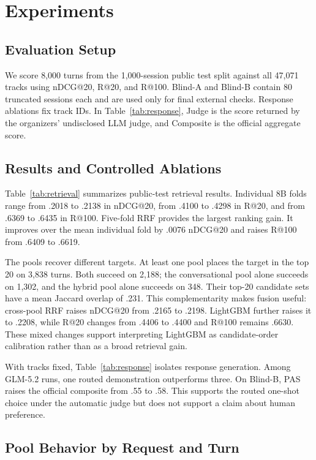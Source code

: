 \documentclass[sigconf]{acmart}
\begin{document}
\section{Experiments}
\label{sec:experiments}

\subsection{Evaluation Setup}

We score 8,000 turns from the 1,000-session public test split against all 47,071
tracks using nDCG@20, R@20, and R@100. Blind-A and Blind-B contain 80 truncated
sessions each and are used only for final external checks. Response ablations
fix track IDs. In Table~\ref{tab:response}, Judge is the score returned by the
organizers' undisclosed LLM judge, and Composite is the official aggregate
score.


\subsection{Results and Controlled Ablations}

Table~\ref{tab:retrieval} summarizes public-test retrieval results. Individual 8B folds
range from .2018 to .2138 in nDCG@20, from .4100 to .4298 in R@20, and from
.6369 to .6435 in R@100. Five-fold RRF provides the largest ranking gain. It improves
over the mean individual fold by .0076 nDCG@20 and raises R@100 from .6409 to
.6619.

The pools recover different targets. At least one pool places the target in the
top 20 on 3,838 turns. Both succeed on 2,188; the conversational pool alone
succeeds on 1,302, and the hybrid pool alone succeeds on 348. Their top-20
candidate sets have a mean Jaccard overlap of .231. This complementarity makes
fusion useful: cross-pool RRF raises nDCG@20 from .2165 to .2198. LightGBM
further raises it to .2208, while R@20 changes from .4406 to .4400 and R@100
remains .6630. These mixed changes support interpreting LightGBM as
candidate-order calibration rather than as a broad retrieval gain.

With tracks fixed, Table~\ref{tab:response} isolates response generation. Among
GLM-5.2 runs, one routed demonstration outperforms three. On Blind-B, PAS raises the
official composite from .55 to .58. This supports the routed one-shot choice
under the automatic judge but does not support a claim about human preference.

\subsection{Pool Behavior by Request and Turn}
\end{document}
